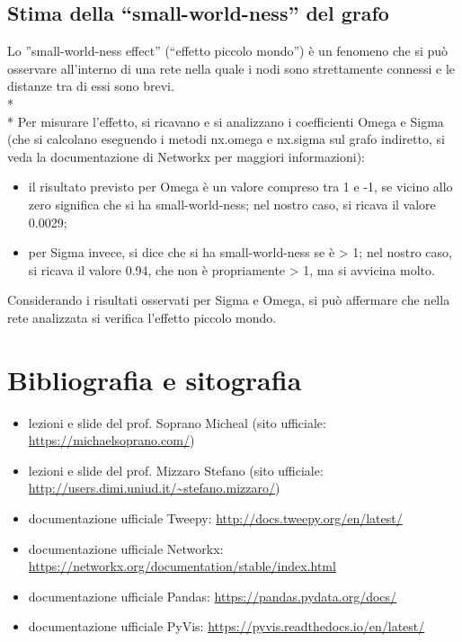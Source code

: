 \documentclass[a4paper, 12pt, twoside]{article}
\begin{document}
\subsection{Stima della “small-world-ness” del grafo}
Lo ”small-world-ness effect” (“effetto piccolo mondo”) è un fenomeno che si può osservare all’interno di una rete nella quale i nodi sono strettamente connessi e le distanze tra di essi sono brevi. \\* \\*
Per misurare l'effetto, si ricavano e si analizzano i coefficienti Omega e Sigma (che si calcolano eseguendo i metodi nx.omega e nx.sigma sul grafo indiretto, si veda la documentazione di Networkx per maggiori informazioni):
\begin{itemize}
    \item il risultato previsto per Omega è un valore compreso tra 1 e -1, se vicino allo zero significa che si ha small-world-ness; nel nostro caso, si ricava il valore 0.0029;
    \item per Sigma invece, si dice che si ha small-world-ness se è > 1; nel nostro caso, si ricava il valore 0.94, che non è propriamente > 1, ma si avvicina molto.
\end{itemize}
Considerando i risultati osservati per Sigma e Omega, si può affermare che nella rete analizzata si verifica l’effetto piccolo mondo.




\section{Bibliografia e sitografia}\label{sec:biblio_e_sito}
\begin{itemize}
    \item lezioni e slide del prof. Soprano Micheal (sito ufficiale: \url{https://michaelsoprano.com/})
    \item lezioni e slide del prof. Mizzaro Stefano (sito ufficiale: \url{http://users.dimi.uniud.it/~stefano.mizzaro/}) 
    \item documentazione ufficiale Tweepy: \url{http://docs.tweepy.org/en/latest/}
    \item documentazione ufficiale Networkx: \url{https://networkx.org/documentation/stable/index.html}
    \item documentazione ufficiale Pandas: \url{https://pandas.pydata.org/docs/}
    \item documentazione ufficiale PyVis: \url{https://pyvis.readthedocs.io/en/latest/}
\end{itemize}
\end{document}

